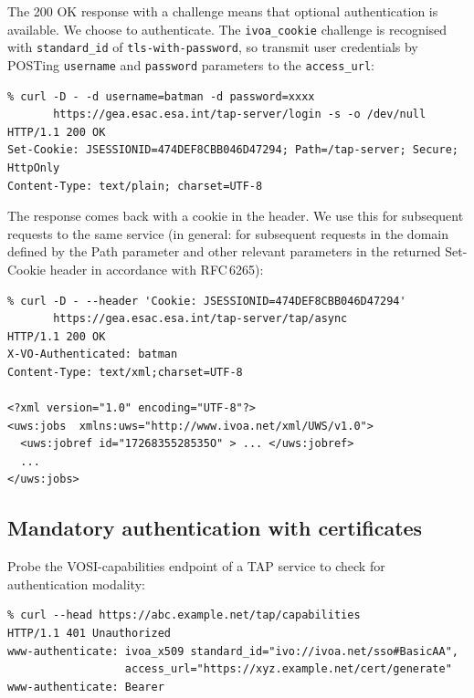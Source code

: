 \documentclass[11pt,a4paper]{ivoa}
\newcommand{\rfc}[1]{RFC\,#1}
\begin{document}
\noindent
The 200 OK response with a challenge means that optional authentication
is available.
We choose to authenticate.
The \verb|ivoa_cookie| challenge is recognised with \verb|standard_id|
of \verb|tls-with-password|, so transmit user credentials
by POSTing \verb|username| and \verb|password| parameters
to the \verb|access_url|:
{\footnotesize
\begin{verbatim}
% curl -D - -d username=batman -d password=xxxx
       https://gea.esac.esa.int/tap-server/login -s -o /dev/null
HTTP/1.1 200 OK
Set-Cookie: JSESSIONID=474DEF8CBB046D47294; Path=/tap-server; Secure; HttpOnly
Content-Type: text/plain; charset=UTF-8
\end{verbatim}
}

\noindent
The response comes back with a cookie in the header.
We use this for subsequent requests to the same service
(in general: for subsequent requests in the domain defined by the Path
parameter and other relevant parameters in the returned Set-Cookie header
in accordance with \rfc{6265}):
{\footnotesize
\begin{verbatim}
% curl -D - --header 'Cookie: JSESSIONID=474DEF8CBB046D47294'
       https://gea.esac.esa.int/tap-server/tap/async
HTTP/1.1 200 OK
X-VO-Authenticated: batman
Content-Type: text/xml;charset=UTF-8

<?xml version="1.0" encoding="UTF-8"?>
<uws:jobs  xmlns:uws="http://www.ivoa.net/xml/UWS/v1.0">
  <uws:jobref id="1726835528535O" > ... </uws:jobref>
  ...
</uws:jobs>
\end{verbatim}
}

\subsection{Mandatory authentication with certificates}
\label{sec:x509-example}


Probe the VOSI-capabilities endpoint of a TAP service to check
for authentication modality:
{\footnotesize
\begin{verbatim}
% curl --head https://abc.example.net/tap/capabilities
HTTP/1.1 401 Unauthorized
www-authenticate: ivoa_x509 standard_id="ivo://ivoa.net/sso#BasicAA",
                  access_url="https://xyz.example.net/cert/generate"
www-authenticate: Bearer
\end{verbatim}
}
\end{document}
